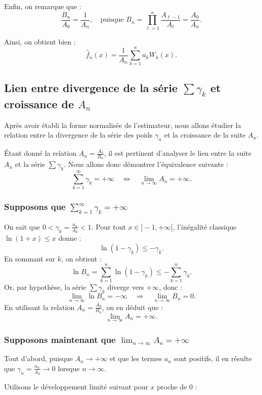 \documentclass[12pt]{article}
\begin{document}
Enfin, on remarque que :
\[
\frac{B_n}{A_0} = \frac{1}{A_n},
\quad \text{puisque } B_n = \prod_{\ell=1}^n \frac{A_{\ell-1}}{A_\ell} = \frac{A_0}{A_n}.
\]

Ainsi, on obtient bien :
\[
\hat{f}_n(x) = \frac{1}{A_n} \sum_{k=1}^n a_k W_k(x).
\]

\subsection{Lien entre divergence de la série \( \sum \gamma_k \) et croissance de \( A_n \)}

Après avoir établi la forme normalisée de l'estimateur, nous allons étudier la relation entre la divergence de la série des poids \( \gamma_n \) et la croissance de la suite \( A_n \).

Étant donné la relation \( A_n = \frac{A_0}{B_n} \), il est pertinent d'analyser le lien entre la suite \( A_n \) et la série \( \sum \gamma_k \). Nous allons donc démontrer l’équivalence suivante :
\[
\sum_{k=1}^{\infty} \gamma_k = +\infty \quad \Longleftrightarrow \quad \lim_{n \to \infty} A_n = +\infty.
\]

\subsubsection*{Supposons que \( \sum_{k=1}^\infty \gamma_k = +\infty \)}

On sait que \( 0 < \gamma_k = \frac{a_k}{A_k} < 1 \). Pour tout \( x \in ]-1, +\infty[ \), l’inégalité classique \( \ln(1 + x) \leq x \) donne :
\[
\ln(1 - \gamma_k) \leq -\gamma_k.
\]
En sommant sur \( k \), on obtient :
\[
\ln B_n = \sum_{k=1}^n \ln(1 - \gamma_k) \leq -\sum_{k=1}^n \gamma_k.
\]
Or, par hypothèse, la série \( \sum \gamma_k \) diverge vers \( +\infty \), donc :
\[
\lim_{n \to \infty} \ln B_n = -\infty \quad \Rightarrow \quad \lim_{n \to \infty} B_n = 0.
\]
En utilisant la relation \( A_n = \frac{A_0}{B_n} \), on en déduit que :
\[
\lim_{n \to \infty} A_n = +\infty.
\]

\subsubsection*{Supposons maintenant que \(\lim_{n \to \infty} A_n = +\infty\)}


Tout d'abord, puisque \( A_n \to +\infty \) et que les termes \( a_n \) sont positifs, il en résulte que \( \gamma_n = \frac{a_n}{A_n} \to 0 \) lorsque \( n \to \infty \).

Utilisons le développement limité suivant pour \( x \) proche de 0 :
\end{document}

